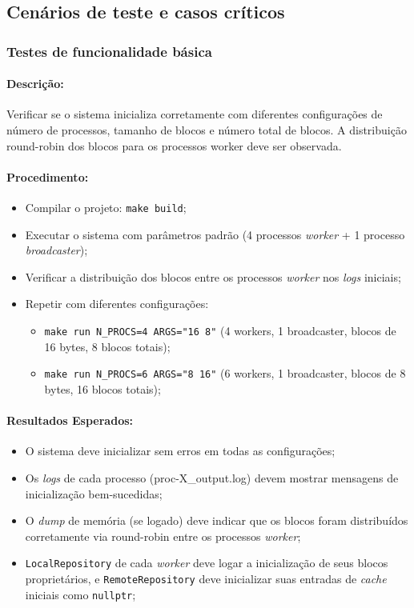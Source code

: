 \documentclass[12pt]{article}
\begin{document}
\subsection{Cenários de teste e casos críticos}
\subsubsection{Testes de funcionalidade básica}
\paragraph{Descrição:} Verificar se o sistema inicializa corretamente com diferentes configurações de número de processos, tamanho de blocos e número total de blocos. A distribuição round-robin dos blocos para os processos worker deve ser observada.

\paragraph{Procedimento:}
\begin{itemize}
  \item Compilar o projeto: \texttt{make build};
  \item Executar o sistema com parâmetros padrão (4 processos \textit{worker} + 1 processo \textit{broadcaster});
  \item Verificar a distribuição dos blocos entre os processos \textit{worker} nos \textit{logs} iniciais;
  \item Repetir com diferentes configurações:
  \begin{itemize}
    \item \texttt{make run N\_PROCS=4 ARGS="16 8"} (4 workers, 1 broadcaster, blocos de 16 bytes, 8 blocos totais);
    \item \texttt{make run N\_PROCS=6 ARGS="8 16"} (6 workers, 1 broadcaster, blocos de 8 bytes, 16 blocos totais);
  \end{itemize}
\end{itemize}

\paragraph{Resultados Esperados:}
\begin{itemize}
  \item O sistema deve inicializar sem erros em todas as configurações;
  \item Os \textit{logs} de cada processo (proc-X\_output.log) devem mostrar mensagens de inicialização bem-sucedidas;
  \item O \textit{dump} de memória (se logado) deve indicar que os blocos foram distribuídos corretamente via
    round-robin entre os processos \textit{worker};
  \item \texttt{LocalRepository} de cada \textit{worker} deve logar a inicialização de seus blocos proprietários, e
    \texttt{RemoteRepository} deve inicializar suas entradas de \textit{cache} iniciais como \texttt{nullptr};
\end{itemize}
\end{document}
